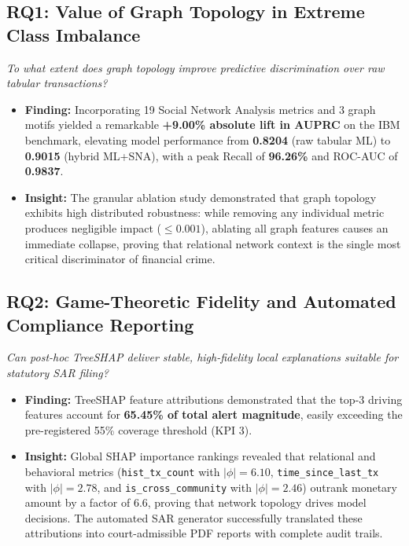 \subsection{RQ1: Value of Graph Topology in Extreme Class Imbalance}
\textit{To what extent does graph topology improve predictive discrimination over raw tabular transactions?}
\begin{itemize}
    \item \textbf{Finding:} Incorporating 19 Social Network Analysis metrics and 3 graph motifs yielded a remarkable \textbf{+9.00\% absolute lift in AUPRC} on the IBM benchmark, elevating model performance from \textbf{0.8204} (raw tabular ML) to \textbf{0.9015} (hybrid ML+SNA), with a peak Recall of \textbf{96.26\%} and ROC-AUC of \textbf{0.9837}.
    \item \textbf{Insight:} The granular ablation study demonstrated that graph topology exhibits high distributed robustness: while removing any individual metric produces negligible impact ($\le 0.001$), ablating all graph features causes an immediate collapse, proving that relational network context is the single most critical discriminator of financial crime.
\end{itemize}

\subsection{RQ2: Game-Theoretic Fidelity and Automated Compliance Reporting}
\textit{Can post-hoc TreeSHAP deliver stable, high-fidelity local explanations suitable for statutory SAR filing?}
\begin{itemize}
    \item \textbf{Finding:} TreeSHAP feature attributions demonstrated that the top-3 driving features account for \textbf{65.45\% of total alert magnitude}, easily exceeding the pre-registered 55\% coverage threshold (KPI 3).
    \item \textbf{Insight:} Global SHAP importance rankings revealed that relational and behavioral metrics (\texttt{hist\_tx\_count} with $|\phi|=6.10$, \texttt{time\_since\_last\_tx} with $|\phi|=2.78$, and \texttt{is\_cross\_community} with $|\phi|=2.46$) outrank monetary amount by a factor of 6.6, proving that network topology drives model decisions. The automated SAR generator successfully translated these attributions into court-admissible PDF reports with complete audit trails.
\end{itemize}

